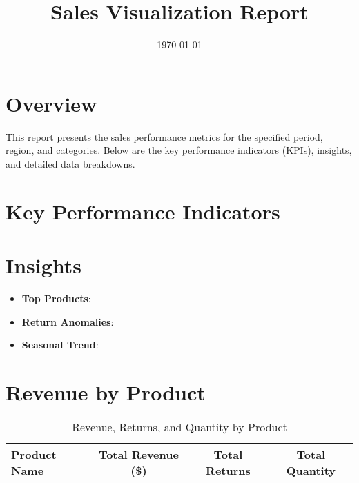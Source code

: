 \documentclass[a4paper,12pt]{article}
\title{Sales Visualization Report}
\author{}
\date{\today}
\begin{document}
\maketitle

\section{Overview}
This report presents the sales performance metrics for the specified period, region, and categories. Below are the key performance indicators (KPIs), insights, and detailed data breakdowns.

\section{Key Performance Indicators}

\section{Insights}
\begin{itemize}
    \item \textbf{Top Products}: %
    \item \textbf{Return Anomalies}: %
    \item \textbf{Seasonal Trend}: %
\end{itemize}

\section{Revenue by Product}
\begin{landscape}
\begin{table}[h]
\centering
\caption{Revenue, Returns, and Quantity by Product}
\begin{tabular}{l S[table-format=10.2] S[table-format=10.2] S[table-format=10.0]}
\toprule
\textbf{Product Name} & \textbf{Total Revenue (\$)} & \textbf{Total Returns} & \textbf{Total Quantity} \\
\midrule
\bottomrule
\end{tabular}
\end{table}
\end{landscape}
\end{document}
